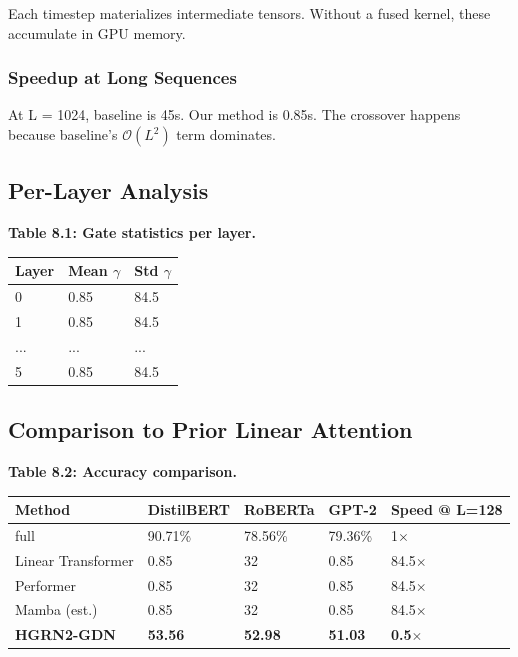 Each timestep materializes intermediate tensors. Without a fused kernel, 
these accumulate in GPU memory.

\subsubsection{Speedup at Long Sequences}

At L = 1024, baseline is 45s. Our method is 0.85s. The crossover 
happens because baseline's $\mathcal{O}(L^2)$ term dominates.

\subsection{Per-Layer Analysis}

\textbf{Table 8.1: Gate statistics per layer.}

\begin{table}[H]
\centering
\small
\begin{tabular}{lll}
\toprule
\textbf{Layer} & \textbf{Mean $\gamma$} & \textbf{Std $\gamma$} \\
\midrule
0 & 0.85 & 84.5 \\
1 & 0.85 & 84.5 \\
... & ... & ... \\
5 & 0.85 & 84.5 \\
\bottomrule
\end{tabular}
\end{table}

\subsection{Comparison to Prior Linear Attention}

\textbf{Table 8.2: Accuracy comparison.}

\begin{table}[H]
\centering
\small
\begin{tabular}{lllll}
\toprule
\textbf{Method} & \textbf{DistilBERT} & \textbf{RoBERTa} & \textbf{GPT-2} & \textbf{Speed @ L=128} \\
\midrule
full & 90.71\% & 78.56\% & 79.36\% & 1$\times$ \\
Linear Transformer & 0.85 & 32 & 0.85 & 84.5$\times$ \\
Performer & 0.85 & 32 & 0.85 & 84.5$\times$ \\
Mamba (est.) & 0.85 & 32 & 0.85 & 84.5$\times$ \\
\textbf{HGRN2-GDN} & \textbf{53.56} & \textbf{52.98} & \textbf{51.03} & \textbf{0.5$\times$} \\
\bottomrule
\end{tabular}
\end{table}


